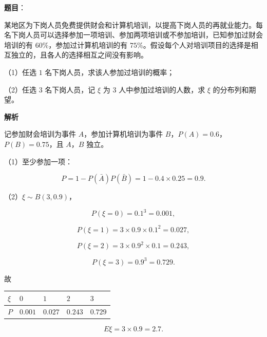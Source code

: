 \begin{answer}

\textbf{题目}：

某地区为下岗人员免费提供财会和计算机培训，以提高下岗人员的再就业能力。每名下岗人员可以选择参加一项培训、参加两项培训或不参加培训，已知参加过财会培训的有 $60\%$，参加过计算机培训的有 $75\%$。假设每个人对培训项目的选择是相互独立的，且各人的选择相互之间没有影响。

（1）任选 $1$ 名下岗人员，求该人参加过培训的概率；

（2）任选 $3$ 名下岗人员，记 $\xi$ 为 $3$ 人中参加过培训的人数，求 $\xi$ 的分布列和期望。

\textbf{解析}

记参加财会培训为事件 $A$，参加计算机培训为事件 $B$，$P(A)=0.6$，$P(B)=0.75$，且 $A$，$B$ 独立。

（1）至少参加一项：

\nopagebreak[4]
\[P=1-P(\bar A)P(\bar B)=1-0.4\times0.25=0.9.\]

（2）$\xi\sim B(3,0.9)$，

\nopagebreak[4]
\[P(\xi=0)=0.1^3=0.001,\]

\nopagebreak[4]
\[P(\xi=1)=3\times0.9\times0.1^2=0.027,\]

\nopagebreak[4]
\[P(\xi=2)=3\times0.9^2\times0.1=0.243,\]

\nopagebreak[4]
\[P(\xi=3)=0.9^3=0.729.\]

故

\begin{center}
\begin{tabular}{lllll}
\toprule
$\xi$ & $0$ & $1$ & $2$ & $3$ \\
\midrule
$P$ & $0.001$ & $0.027$ & $0.243$ & $0.729$ \\
\bottomrule
\end{tabular}
\end{center}

\nopagebreak[4]
\[E\xi=3\times0.9=2.7.\]


\end{answer}
